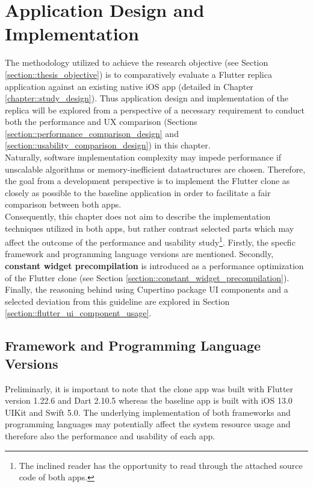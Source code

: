\chapter{Application Design and Implementation} \label{chapter::implementation}
The methodology utilized to achieve the research objective (see Section \ref{section::thesis_objective}) is to comparatively evaluate a Flutter replica application against an existing native iOS app (detailed in Chapter \ref{chapter::study_design}).
Thus application design and implementation of the replica will be explored from a perspective of a necessary requirement to conduct both the performance and UX comparison (Sections \ref{section::performance_comparison_design} and \ref{section::usability_comparison_design}) in this chapter.\\
Naturally, software implementation complexity may impede performance if unscalable algorithms or memory-inefficient datastructures are chosen.
Therefore, the goal from a development perspective is to implement the Flutter clone as closely as possible to the baseline application in order to facilitate a fair comparison between both apps.\\
Consequently, this chapter does not aim to describe the implementation techniques utilized in both apps, but rather contrast selected parts which may affect the outcome of the performance and usability study\footnote{The inclined reader has the opportunity to read through the attached source code of both apps.}.
Firstly, the specfic framework and programming language versions are mentioned.
Secondly, \textbf{constant widget precompilation} is introduced as a performance optimization of the Flutter clone (see Section \ref{section::constant_widget_precompilation}).
Finally, the reasoning behind using Cupertino package UI components and a selected deviation from this guideline are explored in Section \ref{section::flutter_ui_component_usage}.

\section{Framework and Programming Language Versions}
Preliminarly, it is important to note that the clone app was built with Flutter version 1.22.6 and Dart 2.10.5 whereas the baseline app is built with iOS 13.0 UIKit and Swift 5.0.
The underlying implementation of both frameworks and programming languages may potentially affect the system resource usage and therefore also the performance and usability of each app.

